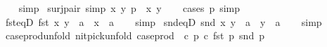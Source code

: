 \begin{isabellebody}
%
\isadelimproof
\ \ %
\endisadelimproof
%
\isatagproof
{}\isamarkupfalse%
\ simp%
\endisatagproof
{\isafoldproof}%
%
\isadelimproof
\isanewline
%
\endisadelimproof
\isanewline
{}\isamarkupfalse%
\ surj{\isacharunderscore}{\kern0pt}pair\ {\isacharbrackleft}{\kern0pt}simp{\isacharbrackright}{\kern0pt}{\isacharcolon}{\kern0pt}\ {\isachardoublequoteopen}{\isasymexists}x\ y{\isachardot}{\kern0pt}\ p\ {\isacharequal}{\kern0pt}\ {\isacharparenleft}{\kern0pt}x{\isacharcomma}{\kern0pt}\ y{\isacharparenright}{\kern0pt}{\isachardoublequoteclose}\isanewline
%
\isadelimproof
\ \ %
\endisadelimproof
%
\isatagproof
{}\isamarkupfalse%
\ {\isacharparenleft}{\kern0pt}cases\ p{\isacharparenright}{\kern0pt}\ simp%
\endisatagproof
{\isafoldproof}%
%
\isadelimproof
\isanewline
%
\endisadelimproof
\isanewline
{}\isamarkupfalse%
\ fst{\isacharunderscore}{\kern0pt}eqD{\isacharcolon}{\kern0pt}\ {\isachardoublequoteopen}fst\ {\isacharparenleft}{\kern0pt}x{\isacharcomma}{\kern0pt}\ y{\isacharparenright}{\kern0pt}\ {\isacharequal}{\kern0pt}\ a\ {\isasymLongrightarrow}\ x\ {\isacharequal}{\kern0pt}\ a{\isachardoublequoteclose}\isanewline
%
\isadelimproof
\ \ %
\endisadelimproof
%
\isatagproof
{}\isamarkupfalse%
\ simp%
\endisatagproof
{\isafoldproof}%
%
\isadelimproof
\isanewline
%
\endisadelimproof
\isanewline
{}\isamarkupfalse%
\ snd{\isacharunderscore}{\kern0pt}eqD{\isacharcolon}{\kern0pt}\ {\isachardoublequoteopen}snd\ {\isacharparenleft}{\kern0pt}x{\isacharcomma}{\kern0pt}\ y{\isacharparenright}{\kern0pt}\ {\isacharequal}{\kern0pt}\ a\ {\isasymLongrightarrow}\ y\ {\isacharequal}{\kern0pt}\ a{\isachardoublequoteclose}\isanewline
%
\isadelimproof
\ \ %
\endisadelimproof
%
\isatagproof
{}\isamarkupfalse%
\ simp%
\endisatagproof
{\isafoldproof}%
%
\isadelimproof
\isanewline
%
\endisadelimproof
\isanewline
{}\isamarkupfalse%
\ case{\isacharunderscore}{\kern0pt}prod{\isacharunderscore}{\kern0pt}unfold\ {\isacharbrackleft}{\kern0pt}nitpick{\isacharunderscore}{\kern0pt}unfold{\isacharbrackright}{\kern0pt}{\isacharcolon}{\kern0pt}\ {\isachardoublequoteopen}case{\isacharunderscore}{\kern0pt}prod\ {\isacharequal}{\kern0pt}\ {\isacharparenleft}{\kern0pt}{\isasymlambda}c\ p{\isachardot}{\kern0pt}\ c\ {\isacharparenleft}{\kern0pt}fst\ p{\isacharparenright}{\kern0pt}\ {\isacharparenleft}{\kern0pt}snd\ p{\isacharparenright}{\kern0pt}{\isacharparenright}{\kern0pt}{\isachardoublequoteclose}\isanewline
%
\isadelimproof
\ \ %
\endisadelimproof
%
\isatagproof
{}\isamarkupfalse%

\end{isabellebody}
